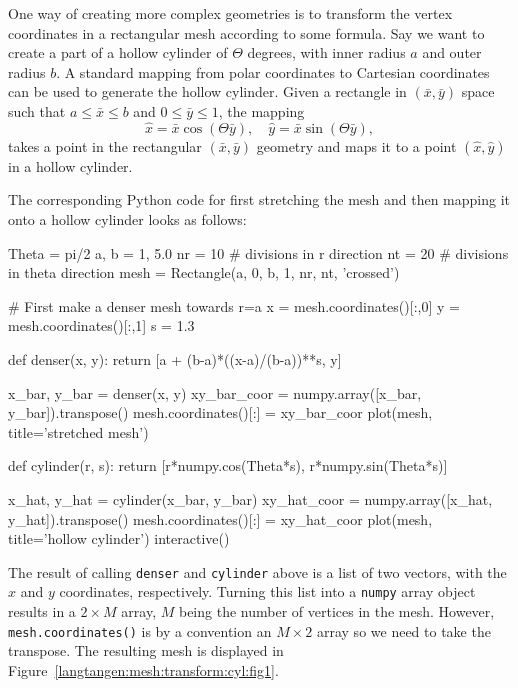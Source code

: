 One way of creating more complex geometries is to transform the
vertex coordinates in a rectangular mesh according to some formula.
Say we want to create a part of a hollow cylinder of $\Theta$ degrees,
with inner radius $a$ and outer radius $b$. A standard mapping from polar
coordinates to Cartesian coordinates can be used to generate the
hollow cylinder. Given a rectangle in $(\bar x, \bar y)$ space such that
$a\leq \bar x\leq b$ and $0\leq \bar y\leq 1$, the mapping
\[ \hat x = \bar x\cos (\Theta \bar y),\quad \hat y = \bar x\sin (\Theta \bar y),\]
takes a point in the rectangular $(\bar x,\bar y)$ 
geometry and maps it to a point
$(\hat x, \hat y)$ in a hollow cylinder.

The corresponding Python code for first stretching the mesh and
then mapping it onto a hollow cylinder looks as follows:
\begin{python}
Theta = pi/2
a, b = 1, 5.0
nr = 10  # divisions in r direction
nt = 20  # divisions in theta direction
mesh = Rectangle(a, 0, b, 1, nr, nt, 'crossed')

# First make a denser mesh towards r=a
x = mesh.coordinates()[:,0]
y = mesh.coordinates()[:,1]
s = 1.3

def denser(x, y):
    return [a + (b-a)*((x-a)/(b-a))**s, y]

x_bar, y_bar = denser(x, y)
xy_bar_coor = numpy.array([x_bar, y_bar]).transpose()
mesh.coordinates()[:] = xy_bar_coor
plot(mesh, title='stretched mesh')

def cylinder(r, s):
    return [r*numpy.cos(Theta*s), r*numpy.sin(Theta*s)]

x_hat, y_hat = cylinder(x_bar, y_bar)
xy_hat_coor = numpy.array([x_hat, y_hat]).transpose()
mesh.coordinates()[:] = xy_hat_coor
plot(mesh, title='hollow cylinder')
interactive()
\end{python}
The result of calling {\fontsize{10pt}{10pt}\texttt{denser}} and {\fontsize{10pt}{10pt}\texttt{cylinder}} above is a list of two
vectors, with the $x$ and $y$ coordinates, respectively.
Turning this list into a {\fontsize{10pt}{10pt}\texttt{numpy}} array object results in a $2\times M$ 
array, $M$ being the number of vertices in the mesh. However,
{\fontsize{10pt}{10pt}\texttt{mesh.coordinates()}} is by a convention an $M\times 2$ array so we
need to take the transpose. The resulting mesh is displayed
in Figure~\ref{langtangen:mesh:transform:cyl:fig1}.
